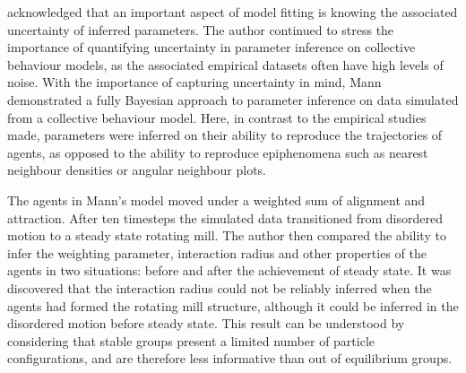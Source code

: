 \textcite{mann11} acknowledged that an important aspect of model fitting is knowing the associated 
uncertainty of inferred parameters. The author continued to stress the importance of quantifying 
uncertainty in parameter inference on collective behaviour models, as the associated empirical 
datasets often have high levels of noise. With the importance of capturing uncertainty in mind, Mann 
demonstrated a fully Bayesian approach to parameter inference on data simulated from a collective 
behaviour model. Here, in contrast to the empirical studies made, parameters were inferred on their 
ability to reproduce the trajectories of agents, as opposed to the ability to reproduce epiphenomena 
such as nearest neighbour densities or angular neighbour plots.

The agents in Mann's model moved under a weighted sum of alignment and attraction. After ten 
timesteps the simulated data transitioned from disordered motion to a steady state rotating mill. The 
author then compared the ability to infer the weighting parameter, interaction radius and other 
properties of the agents in two situations: before and after the achievement of steady state. It was 
discovered that the interaction radius could not be reliably inferred when the agents had formed the 
rotating mill structure, although it could be inferred in the disordered motion before steady state. 
This result can be understood by considering that stable groups present a limited number of particle 
configurations, and are therefore less informative than out of equilibrium groups.
